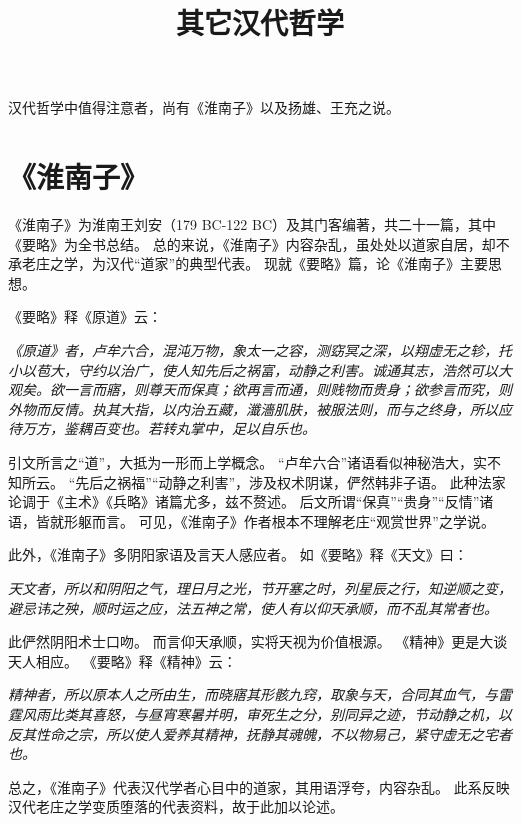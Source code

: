 \documentclass[11pt]{article}
\title{其它汉代哲学}
\date{}
\begin{document}
  \maketitle

  \linenumbers
  
汉代哲学中值得注意者，尚有《淮南子》以及扬雄、王充之说。

\section{《淮南子》}
《淮南子》为淮南王刘安（179 BC-122 BC）及其门客编著，共二十一篇，其中《要略》为全书总结。
总的来说，《淮南子》内容杂乱，虽处处以道家自居，却不承老庄之学，为汉代“道家”的典型代表。
现就《要略》篇，论《淮南子》主要思想。

\par

《要略》释《原道》云：

\textit{《原道》者，卢牟六合，混沌万物，象太一之容，测窈冥之深，以翔虚无之轸，托小以苞大，守约以治广，使人知先后之祸富，动静之利害。诚通其志，浩然可以大观矣。欲一言而寤，则尊天而保真；欲再言而通，则贱物而贵身；欲参言而究，则外物而反情。执其大指，以内治五藏，瀸濇肌肤，被服法则，而与之终身，所以应待万方，鉴耦百变也。若转丸掌中，足以自乐也。}

引文所言之“道”，大抵为一形而上学概念。
“卢牟六合”诸语看似神秘浩大，实不知所云。
“先后之祸福”“动静之利害”，涉及权术阴谋，俨然韩非子语。
此种法家论调于《主术》《兵略》诸篇尤多，兹不赘述。
后文所谓“保真”“贵身”“反情”诸语，皆就形躯而言。
可见，《淮南子》作者根本不理解老庄“观赏世界”之学说。

\par

此外，《淮南子》多阴阳家语及言天人感应者。
如《要略》释《天文》曰：

\textit{天文者，所以和阴阳之气，理日月之光，节开塞之时，列星辰之行，知逆顺之变，避忌讳之殃，顺时运之应，法五神之常，使人有以仰天承顺，而不乱其常者也。}

此俨然阴阳术士口吻。
而言仰天承顺，实将天视为价值根源。
《精神》更是大谈天人相应。
《要略》释《精神》云：

\textit{精神者，所以原本人之所由生，而晓寤其形骸九窍，取象与天，合同其血气，与雷霆风雨比类其喜怒，与昼宵寒暑并明，审死生之分，别同异之迹，节动静之机，以反其性命之宗，所以使人爱养其精神，抚静其魂魄，不以物易己，紧守虚无之宅者也。}

总之，《淮南子》代表汉代学者心目中的道家，其用语浮夸，内容杂乱。
此系反映汉代老庄之学变质堕落的代表资料，故于此加以论述。
\end{document}
